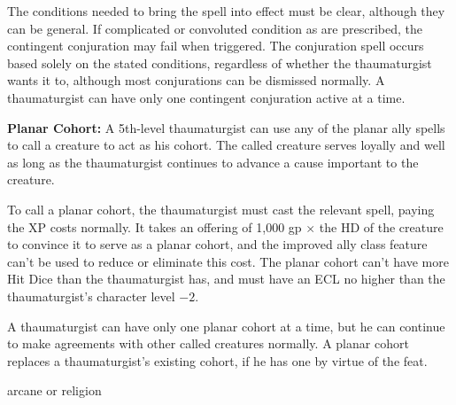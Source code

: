 {The conditions needed to bring the spell into effect must be clear, although they can be general. If complicated or convoluted condition as are prescribed, the contingent conjuration may fail when triggered. The conjuration spell occurs based solely on the stated conditions, regardless of whether the thaumaturgist wants it to, although most conjurations can be dismissed normally. A thaumaturgist can have only one contingent conjuration active at a time.

\textbf{Planar Cohort:} A 5th-level thaumaturgist can use any of the planar ally spells to call a creature to act as his cohort. The called creature serves loyally and well as long as the thaumaturgist continues to advance a cause important to the creature.

To call a planar cohort, the thaumaturgist must cast the relevant spell, paying the XP costs normally. It takes an offering of 1,000 gp $\times$ the HD of the creature to convince it to serve as a planar cohort, and the improved ally class feature can't be used to reduce or eliminate this cost. The planar cohort can't have more Hit Dice than the thaumaturgist has, and must have an ECL no higher than the thaumaturgist's character level $-2$.

A thaumaturgist can have only one planar cohort at a time, but he can continue to make agreements with other called creatures normally. A planar cohort replaces a thaumaturgist's existing cohort, if he has one by virtue of the  feat.
}
{}
{arcane or religion}
{}
{}
{}